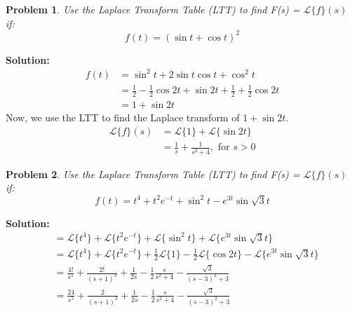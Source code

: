 \documentclass{article}
\newtheorem{problem}{Problem}
\begin{document}
    \newpage
    \begin{problem}
        Use the Laplace Transform Table (LTT) to find F(s) = $\mathcal{L}\{f\}(s)$ if:
        \[
            f(t) = (\sin{t} + \cos{t})^{2}
        \]
    \end{problem}
    \textbf{Solution:}
    \begin{align*}
        f(t) &= \sin^{2}{t} +2\sin{t}\cos{t} + \cos^{2}{t} \\
        &= \frac{1}{2} - \frac{1}{2}\cos{2t} + \sin{2t} + \frac{1}{2} + \frac{1}{2}\cos{2t} \\
        &= 1 + \sin{2t} 
    \end{align*}
    Now, we use the LTT to find the Laplace transform of $1 + \sin{2t}$. \\
    \begin{align*}
        \mathcal{L}\{f\}(s) &= \mathcal{L}\{1\} + \mathcal{L}\{\sin{2t}\} \\
        &= \frac{1}{s} + \frac{1}{s^{2} + 4}, \text{ for } s > 0 
    \end{align*}

    \newpage
    \begin{problem}
        Use the Laplace Transform Table (LTT) to find F(s) = $\mathcal{L}\{f\}(s)$ if:
        \[
            f(t) = t^{4} + t^{2}e^{-t} + \sin^{2}{t} - e^{3t}\sin{\sqrt{3}t}
        \]
    \end{problem}
    \textbf{Solution:}
    \begin{align*}
        &= \mathcal{L}\{t^{4}\}  + \mathcal{L}\{t^{2}e^{-t}\} + \mathcal{L}\{\sin^{2}{t}\} + \mathcal{L}\{e^{3t}\sin{\sqrt{3}t}\} \\
        &= \mathcal{L}\{t^{4}\}  + \mathcal{L}\{t^{2}e^{-t}\} + \frac{1}{2}\mathcal{L}\{1\} - \frac{1}{2}\mathcal{L}\{\cos{2t}\} - \mathcal{L}\{e^{3t}\sin{\sqrt{3}t}\} \\
        &= \frac{4!}{s^{5}} + \frac{2!}{(s + 1)^{3}} + \frac{1}{2s} - \frac{1}{2}\frac{s}{s^{2} + 4} -\frac{\sqrt{3}}{(s - 3)^{2} + 3} \\
        &= \frac{24}{s^{5}} + \frac{2}{(s + 1)^{3}} + \frac{1}{2s} - \frac{1}{2}\frac{s}{s^{2} + 4} -\frac{\sqrt{3}}{(s - 3)^{2} + 3} \\
    \end{align*}
\end{document}
